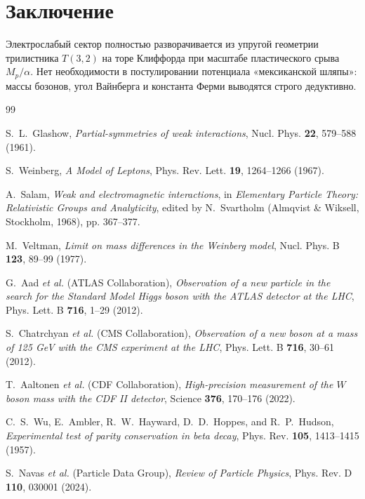 \documentclass[11pt,a4paper]{article}
\theoremstyle{definition}
\theoremstyle{remark}
\begin{document}
\section{Заключение}
Электрослабый сектор полностью разворачивается из упругой геометрии трилистника $T(3,2)$ на торе Клиффорда при масштабе пластического срыва $M_p/\alpha$. Нет необходимости в постулировании потенциала «мексиканской шляпы»: массы бозонов, угол Вайнберга и константа Ферми выводятся строго дедуктивно.

\begin{thebibliography}{99}

S.~L.~Glashow, \textit{Partial-symmetries of weak interactions}, Nucl. Phys. \textbf{22}, 579--588 (1961).

S.~Weinberg, \textit{A Model of Leptons}, Phys. Rev. Lett. \textbf{19}, 1264--1266 (1967).

A.~Salam, \textit{Weak and electromagnetic interactions}, in \textit{Elementary Particle Theory: Relativistic Groups and Analyticity}, edited by N.~Svartholm (Almqvist \& Wiksell, Stockholm, 1968), pp. 367--377.

M.~Veltman, \textit{Limit on mass differences in the Weinberg model}, Nucl. Phys. B \textbf{123}, 89--99 (1977).

G.~Aad \textit{et al.} (ATLAS Collaboration), \textit{Observation of a new particle in the search for the Standard Model Higgs boson with the ATLAS detector at the LHC}, Phys. Lett. B \textbf{716}, 1--29 (2012).

S.~Chatrchyan \textit{et al.} (CMS Collaboration), \textit{Observation of a new boson at a mass of 125 GeV with the CMS experiment at the LHC}, Phys. Lett. B \textbf{716}, 30--61 (2012).

T.~Aaltonen \textit{et al.} (CDF Collaboration), \textit{High-precision measurement of the $W$ boson mass with the CDF II detector}, Science \textbf{376}, 170--176 (2022).

C.~S.~Wu, E.~Ambler, R.~W.~Hayward, D.~D.~Hoppes, and R.~P.~Hudson, \textit{Experimental test of parity conservation in beta decay}, Phys. Rev. \textbf{105}, 1413--1415 (1957).

S.~Navas \textit{et al.} (Particle Data Group), \textit{Review of Particle Physics}, Phys. Rev. D \textbf{110}, 030001 (2024).

\end{thebibliography}
\end{document}
